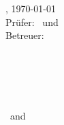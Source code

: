 \hfill
\vfill
{
	\small
	\textbf{\thesisName} \\
	\textit{\thesisTitle} \\
	\thesisSubject, \today \\
	Prüfer: \thesisFirstReviewer\ und \thesisSecondReviewer \\
	Betreuer: \thesisFirstSupervisor \\[1.5em]
	\textbf{\thesisUniversity} \\
	\textit{\thesisUniversityGroup} \\
	\thesisUniversityInstitute \\
	\thesisUniversityDepartment \\
	\thesisUniversityStreetAddress \\
	\thesisUniversityPostalCode\ and \thesisUniversityCity
}
